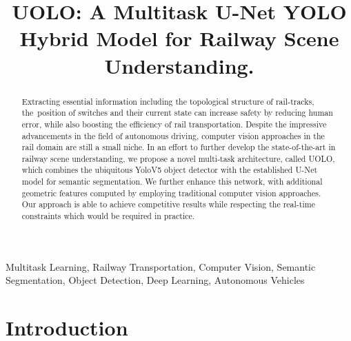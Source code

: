 \documentclass[conference]{IEEEtran}
\begin{document}
\title{UOLO: A Multitask U-Net YOLO Hybrid Model for Railway Scene Understanding.}

\author{
}

\maketitle

\begin{abstract}
Extracting essential information including the topological structure of  rail-tracks, the\ position of switches and their current state can increase safety by reducing human error, while also boosting the efficiency of rail transportation. Despite the impressive advancements in the field of autonomous driving, computer vision approaches in the rail domain are still a small niche. In an effort to further develop the \mbox{state-of-the-art} in railway scene understanding, we propose a novel \mbox{multi-task} architecture, called UOLO, which combines the ubiquitous YoloV5 object detector with the established U-Net model for semantic segmentation. We further enhance this network, with additional geometric features computed by employing traditional computer vision approaches. Our approach is able to achieve competitive results while respecting the real-time constraints which would be required in practice.
\end{abstract}

\begin{IEEEkeywords}
Multitask Learning, Railway Transportation, Computer Vision, Semantic Segmentation, Object Detection, Deep Learning, Autonomous Vehicles
\end{IEEEkeywords}

\section{Introduction}
\label{sec:intro}
\end{document}
